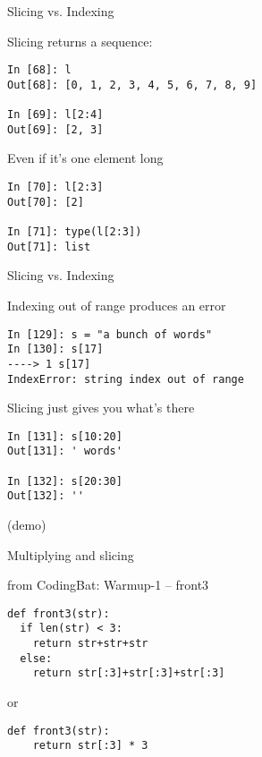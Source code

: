 \documentclass{beamer}
\begin{document}
\begin{frame}[fragile]{Slicing vs. Indexing}

{\Large Slicing returns a sequence:}

\begin{verbatim}
In [68]: l
Out[68]: [0, 1, 2, 3, 4, 5, 6, 7, 8, 9]

In [69]: l[2:4]
Out[69]: [2, 3]
\end{verbatim}

Even if it's one element long

\begin{verbatim}
In [70]: l[2:3]
Out[70]: [2]

In [71]: type(l[2:3])
Out[71]: list
\end{verbatim}

\end{frame}

\begin{frame}[fragile]{Slicing vs. Indexing}

{\Large Indexing out of range produces an error}
\vfill
\begin{verbatim}
In [129]: s = "a bunch of words"
In [130]: s[17]
----> 1 s[17]
IndexError: string index out of range
\end{verbatim}

\vfill
{\Large Slicing just gives you what's there}

\begin{verbatim}
In [131]: s[10:20]
Out[131]: ' words'

In [132]: s[20:30]
Out[132]: ''
\end{verbatim}
(demo)
\end{frame}

\begin{frame}[fragile]{Multiplying and slicing}

{\Large from CodingBat: Warmup-1 -- front3}

\begin{verbatim}
def front3(str):
  if len(str) < 3:
    return str+str+str
  else:
    return str[:3]+str[:3]+str[:3]
\end{verbatim}

{\Large or}

\begin{verbatim}
def front3(str):
    return str[:3] * 3
\end{verbatim}

\end{frame} 
\end{document}
